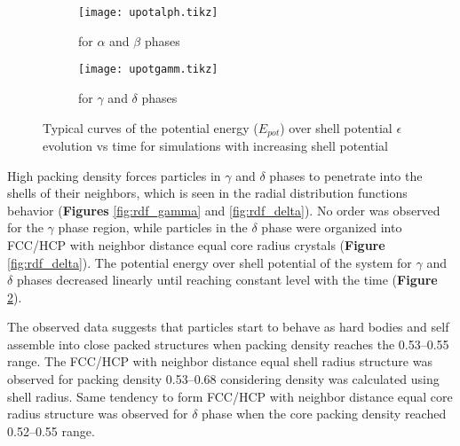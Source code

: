 \begin{figure}
\centering
\begin{subfigure}{.32\textwidth}
  \centering
  \texttt{[image: upotalph.tikz]}
  \caption{for $\alpha$ and $\beta$ phases}
  \label{fig:epot_alpha} 
\end{subfigure}
\begin{subfigure}{.32\textwidth}
  \centering
   \texttt{[image: upotgamm.tikz]}
  \caption{for $\gamma$ and $\delta$ phases}
  \label{fig:epot_gamma}  
 \end{subfigure}
\caption{Typical curves of the potential energy ($E_{pot}$) over shell potential $\epsilon$ evolution vs time for simulations with increasing shell potential}
\label{fig:epot_1}
\end{figure}

High packing density forces particles in $\gamma$ and $\delta$ phases to penetrate into the shells of their neighbors, which is seen in the radial distribution functions behavior (\textbf{Figures} \ref{fig:rdf_gamma} and \ref{fig:rdf_delta}). No order was observed for the $\gamma$ phase region, while particles in the $\delta$ phase were organized into FCC/HCP with neighbor distance equal core radius crystals (\textbf{Figure} \ref{fig:rdf_delta}). The potential energy over shell potential of the system for $\gamma$ and $\delta$ phases  decreased linearly until reaching constant level with the time (\textbf{Figure} \ref{fig:epot_gamma}). %

The observed data suggests that particles start to behave as hard bodies and self assemble into close packed structures when packing density reaches the 0.53--0.55 range. The FCC/HCP with neighbor distance equal shell radius structure was observed for packing density 0.53--0.68 considering density was calculated using shell radius. Same tendency to form FCC/HCP with neighbor distance equal core radius structure was observed for $\delta$ phase when the core packing density reached 0.52--0.55 range.

